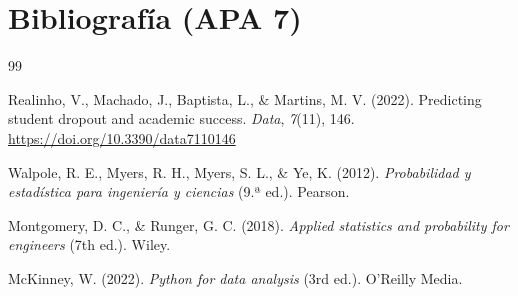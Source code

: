 \documentclass[11pt,a4paper]{article}
\begin{document}

\section{Bibliografía (APA 7)}

\begin{thebibliography}{99}

Realinho, V., Machado, J., Baptista, L., \& Martins, M. V. (2022). Predicting student dropout and academic success. \textit{Data}, \textit{7}(11), 146. \url{https://doi.org/10.3390/data7110146}

Walpole, R. E., Myers, R. H., Myers, S. L., \& Ye, K. (2012). \textit{Probabilidad y estadística para ingeniería y ciencias} (9.ª ed.). Pearson.

Montgomery, D. C., \& Runger, G. C. (2018). \textit{Applied statistics and probability for engineers} (7th ed.). Wiley.

McKinney, W. (2022). \textit{Python for data analysis} (3rd ed.). O'Reilly Media.

\end{thebibliography}
\end{document}
